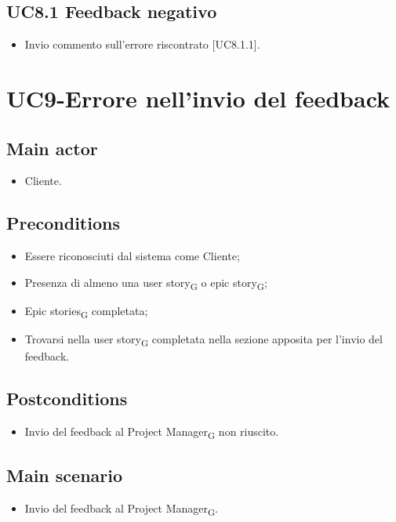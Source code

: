 \documentclass{article}
\begin{document}
    \subsection{UC8.1 Feedback negativo}
    \begin{itemize}
            \item Invio commento sull'errore riscontrato [UC8.1.1].
        \end{itemize}
    \newpage
        
\section{UC9-Errore nell'invio del feedback}

     \subsection*{Main actor}
     \begin{itemize}
         \item Cliente.
     \end{itemize}
     \subsection*{Preconditions} 
 \begin{itemize}
        \item Essere riconosciuti dal sistema come Cliente;
        \item Presenza di almeno una user story\textsubscript{G}  o epic story\textsubscript{G};
        \item Epic stories\textsubscript{G}  completata;
        \item Trovarsi nella user story\textsubscript{G}  completata nella sezione apposita per l'invio del feedback.
    \end{itemize}
     \subsection*{Postconditions} 
        \begin{itemize}
            \item Invio del feedback al Project Manager\textsubscript{G}  non riuscito.
        \end{itemize} 
        \subsection*{Main scenario}
        \begin{itemize}
            \item Invio del feedback al Project Manager\textsubscript{G}.
        \end{itemize}
\end{document}

